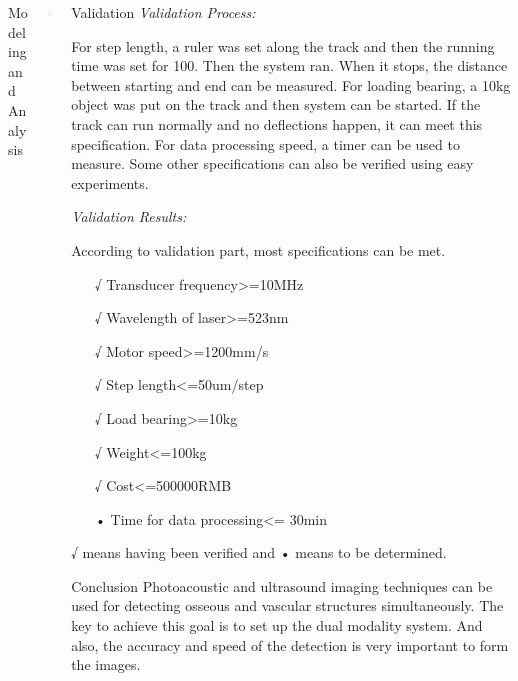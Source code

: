 \documentclass[final]{beamer}
\begin{document}
\begin{frame}
\begin{columns}[t]
\begin{column}{\colwidth}
\begin{tcolorbox}[width=\colwidth,height=\contentheight,top=.2in]
\begin{block}{Modeling and Analysis}
\end{block}

\end{tcolorbox}
\end{column}

\begin{column}{\marginwidth-\parsep}\end{column} %

\begin{column}{\colwidth} %
\begin{tcolorbox}[width=\colwidth,height=\contentheight,top=.2in]
\begin{block}{Validation}
\textit{Validation Process:}
    
For step length, a ruler was set along the track and then the running time was set for 100. Then the system ran. When it stops, the distance between starting and end can be measured. 
For loading bearing, a 10kg object was put on the track and then system can be started. If the track can run normally and no deflections happen, it can meet this specification.
For data processing speed, a timer can be used to measure.
Some other specifications can also be verified using easy experiments. \bigskip

\textit{Validation Results:}

According to validation part, most specifications can be met.
\begin{itemize}
\item[√] Transducer frequency>=10MHz
\item[√] Wavelength of laser>=523nm
\item[√] Motor speed>=1200mm/s
\item[√] Step length<=50um/step
\item[√] Load bearing>=10kg
\item[√] Weight<=100kg
\item[√] Cost<=500000RMB
\item[•] Time for data processing<= 30min
\end{itemize}

{\scriptsize √ means having been verified and • means to be determined.}
\end{block}

\begin{block}{Conclusion}
Photoacoustic and ultrasound imaging techniques can be used for detecting osseous and vascular structures simultaneously. The key to achieve this goal is to set up the dual modality system. And also, the accuracy and speed of the detection is very important to form the images.
\end{block}


\end{tcolorbox}
\end{column}
\end{columns}
\end{frame}
\end{document}
